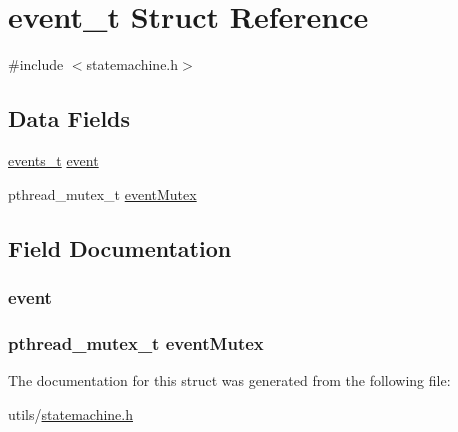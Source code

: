 \hypertarget{structevent__t}{\section{event\-\_\-t Struct Reference}
\label{structevent__t}
}


{\ttfamily \#include $<$statemachine.\-h$>$}

\subsection*{Data Fields}
\begin{DoxyCompactItemize}
\item 
\hyperlink{statemachine_8h_afa19c64a1a59097d61f4885e8b143a01}{events\-\_\-t} \hyperlink{structevent__t_aebf51ab0ceaa6c97201fe073ee814d2a}{event}
\item 
pthread\-\_\-mutex\-\_\-t \hyperlink{structevent__t_a8a8305704a13064a359c8d9cd98597df}{event\-Mutex}
\end{DoxyCompactItemize}


\subsection{Field Documentation}
\hypertarget{structevent__t_aebf51ab0ceaa6c97201fe073ee814d2a}{
\subsubsection[{event}]{ event}}\label{structevent__t_aebf51ab0ceaa6c97201fe073ee814d2a}
\hypertarget{structevent__t_a8a8305704a13064a359c8d9cd98597df}{
\subsubsection[{event\-Mutex}]{\setlength{\rightskip}{0pt plus 5cm}pthread\-\_\-mutex\-\_\-t event\-Mutex}}\label{structevent__t_a8a8305704a13064a359c8d9cd98597df}


The documentation for this struct was generated from the following file\-:\begin{DoxyCompactItemize}
\item 
utils/\hyperlink{statemachine_8h}{statemachine.\-h}\end{DoxyCompactItemize}
